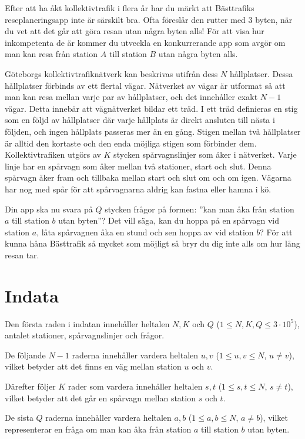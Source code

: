 
\noindent
Efter att ha åkt kollektivtrafik i flera år har du märkt att Bästtrafiks reseplaneringsapp inte är särskilt bra.
Ofta föreslår den rutter med 3 byten, när du vet att det går att göra resan utan några byten alls! För att visa
hur inkompetenta de är kommer du utveckla en konkurrerande app som avgör om man kan resa från station $A$ till
station $B$ utan några byten alls.

Göteborgs kollektivtrafiknätverk kan beskrivas utifrån dess $N$ hållplatser. 
Dessa hållplatser förbinds av ett flertal vägar. Nätverket av vägar är utformat så att man kan resa mellan varje
par av hållplatser, och det innehåller exakt $N-1$ vägar. 
Detta innebär att vägnätverket bildar ett träd. 
I ett träd definieras en stig som en följd av hållplatser där varje hållplats är direkt ansluten till nästa i följden,
och ingen hållplats passeras mer än en gång. Stigen mellan två hållplatser är alltid den kortaste och den enda möjliga
stigen som förbinder dem. Kollektivtrafiken utgörs av $K$ stycken spårvagnslinjer som åker i nätverket. Varje linje har
en spårvagn som åker mellan två stationer, start och slut. Denna spårvagn åker fram och tillbaka mellan start
och slut om och om igen. Vägarna har nog med spår för att spårvagnarna aldrig kan fastna eller hamna i kö.

Din app ska nu svara på $Q$ stycken frågor på formen: ''kan man åka från station $a$ till station $b$
utan byten''? Det vill säga, kan du hoppa på en spårvagn vid station $a$, låta spårvagnen åka en stund och sen
hoppa av vid station $b$? För att kunna håna Bästtrafik så mycket som möjligt så bryr du dig inte alls om hur
lång resan tar.

\section*{Indata}
Den första raden i indatan innehåller heltalen $N, K$ och $Q$ ($1 \le N, K, Q \le 3 \cdot 10^5$), antalet stationer,
spårvagnslinjer och frågor.

De följande $N-1$ raderna innehåller vardera heltalen $u,v$ ($1 \leq u,v \leq N$, $u \neq v$),
vilket betyder att det finns en väg mellan station $u$ och $v$. 

Därefter följer $K$ rader som vardera innehåller heltalen $s,t$ ($1 \leq s,t \leq N$, $s \neq t$), vilket
betyder att det går en spårvagn mellan station $s$ och $t$.

De sista $Q$ raderna innehåller vardera heltalen $a,b$ ($1 \leq a,b \leq N$, $a \neq b$), vilket
representerar en fråga om man kan åka från station $a$ till station $b$ utan byten. 

